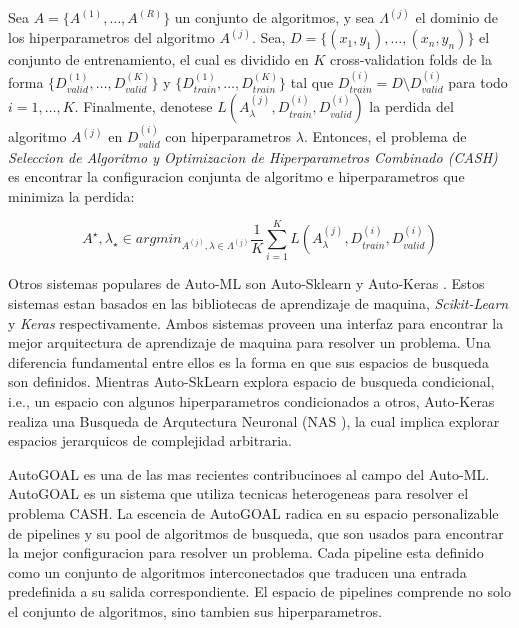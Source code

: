 \begin{definition}
\label{definition:cash}

    Sea $A = \{A^{(1)}, \dots, A^{(R)}\}$ un conjunto de algoritmos, y sea $\Lambda^{(j)}$ el dominio de los hiperparametros del algoritmo $A^{(j)}$. Sea, $D = \{(x_1, y_1), \dots, (x_n, y_n)\}$ el conjunto de entrenamiento, el cual es dividido en $K$ cross-validation folds de la forma $\{D_{valid}^{(1)}, \dots, D_{valid}^{(K)}\}$ y $\{D_{train}^{(1)}, \dots, D_{train}^{(K)}\}$ tal que $D_{train}^{(i)} = D \setminus D_{valid}^{(i)}$ para todo $i = 1, \dots, K$. Finalmente, denotese $L(A_{\lambda}^{(j)}, D_{train}^{(i)},D_{valid}^{(i)})$ la perdida del algoritmo $A^{(j)}$ en $D_{valid}^{(i)}$ con hiperparametros $\lambda$. Entonces, el problema de \textit{Seleccion de Algoritmo y Optimizacion de Hiperparametros Combinado (CASH)} es encontrar la configuracion conjunta de algoritmo e hiperparametros que minimiza la perdida:

    \begin{equation}
        A^{\star}, \lambda_{\star} \in argmin_{A^{(j)}, \lambda \in \Lambda^(j)} \frac{1}{K} \sum_{i=1}^K L(A_{\lambda}^{(j)}, D_{train}^{(i)},D_{valid}^{(i)})
    \end{equation}
\end{definition}

Otros sistemas populares de Auto-ML son Auto-Sklearn \parencite{feurer2015efficient} y Auto-Keras \parencite{autoKeras}. Estos sistemas estan basados en las bibliotecas de aprendizaje de maquina, \textit{Scikit-Learn} \parencite{pedregosa2011scikit} y \textit{Keras} \parencite{chollet2015keras} respectivamente. Ambos sistemas proveen una interfaz para encontrar la mejor arquitectura de aprendizaje de maquina para resolver un problema. Una diferencia fundamental entre ellos es la forma en que sus espacios de busqueda son definidos. Mientras Auto-SkLearn explora espacio de busqueda condicional, i.e., un espacio con algunos hiperparametros condicionados a otros, Auto-Keras realiza una Busqueda de Arqutectura Neuronal (NAS \parencite{NAS}), la cual implica explorar espacios jerarquicos de complejidad arbitraria.

AutoGOAL \parencite{autogoal, estevez2020general} es una de las mas recientes contribucinoes al campo del Auto-ML. AutoGOAL es un sistema que utiliza tecnicas heterogeneas para resolver el problema CASH. La escencia de AutoGOAL radica en su espacio personalizable de pipelines y su pool de algoritmos de busqueda, que son usados para encontrar la mejor configuracion para resolver un problema. Cada pipeline esta definido como un conjunto de algoritmos interconectados que traducen una entrada predefinida a su salida correspondiente. El espacio de pipelines comprende no solo el conjunto de algoritmos, sino tambien sus hiperparametros.

